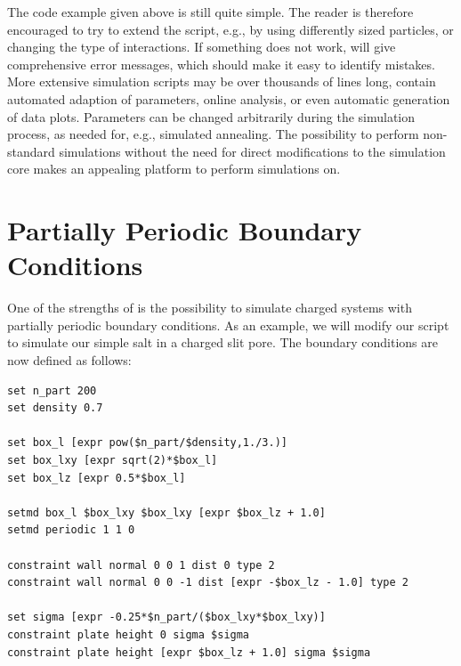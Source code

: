 \documentclass[
a4paper,                        %
11pt,                           %
twoside,                        %
footsepline,                    %
headsepline,                    %
headexclude,                    %
footexclude,                    %
pagesize,                       %
]{scrartcl}
\newtheorem{task}{Task}
\begin{document}
The code example given above is still quite simple. The reader is therefore encouraged to try to extend the script, e.g., by using differently sized particles, or changing the type of interactions. If something does not work, \es{} will give comprehensive error messages, which should make it easy to identify mistakes. More extensive simulation scripts may be over thousands of lines long, contain automated adaption of parameters, online analysis, or even automatic generation of data plots. Parameters can be changed arbitrarily during the simulation process, as needed for, e.g., simulated annealing. The possibility to perform non-standard simulations without the need for direct modifications to the simulation core makes \es{} an appealing platform to perform simulations on.

\vspace{1cm}
\vspace{1cm}

\section{Partially Periodic Boundary Conditions}

One of the strengths of \es{} is the possibility to simulate charged systems with partially periodic boundary conditions. As an example, we will modify our script to simulate our simple salt in a charged slit pore. The boundary conditions are now defined as follows:

{\small\vspace{0,2cm}
\begin{lstlisting}[numbers=none]
set n_part 200
set density 0.7

set box_l [expr pow($n_part/$density,1./3.)]
set box_lxy [expr sqrt(2)*$box_l]
set box_lz [expr 0.5*$box_l]

setmd box_l $box_lxy $box_lxy [expr $box_lz + 1.0]
setmd periodic 1 1 0

constraint wall normal 0 0 1 dist 0 type 2
constraint wall normal 0 0 -1 dist [expr -$box_lz - 1.0] type 2

set sigma [expr -0.25*$n_part/($box_lxy*$box_lxy)]
constraint plate height 0 sigma $sigma
constraint plate height [expr $box_lz + 1.0] sigma $sigma
\end{lstlisting}\vspace{0,2cm}
}
\end{document}
